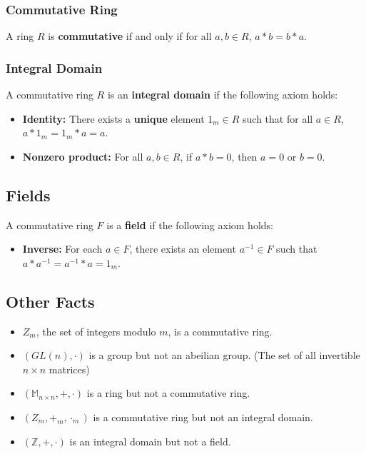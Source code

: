 \documentclass[a4paper,12pt]{article}
\begin{document}
\subsubsection{Commutative Ring}

A ring $R$ is \textbf{commutative} if and only if for all $a,b \in R$, $a*b = b*a$.

\subsubsection{Integral Domain}

A commutative ring $R$ is an \textbf{integral domain} if the following axiom holds:
\begin{itemize}
	\item \textbf{Identity:} There exists a \textbf{unique} element $1_m \in R$ such that for all $a \in R$, $a*1_m = 1_m*a = a$.
	\item \textbf{Nonzero product:} For all $a,b \in R$, if $a*b=0$, then $a=0$ or $b=0$.
\end{itemize}

\subsection{Fields}

A commutative ring $F$ is a \textbf{field} if the following axiom holds:
\begin{itemize}
	\item \textbf{Inverse:} For each $a \in F$, there exists an element $a^{-1} \in F$ such that $a*a^{-1} = a^{-1}*a = 1_m$.
\end{itemize}

\subsection{Other Facts}

\begin{itemize}
	\item $Z_m$, the set of integers modulo $m$, is a commutative ring.
	\item $(GL(n), \cdot)$ is a group but not an abeilian group. (The set of all invertible $n \times n$ matrices)
	\item $(\mathbb{M}_{n \times n}, +, \cdot)$ is a ring but not a commutative ring.
	\item $(Z_m, +_m, \cdot_m)$ is a commutative ring but not an integral domain.
	\item $(\mathbb{Z}, +, \cdot)$ is an integral domain but not a field.
\end{itemize}
\end{document}
